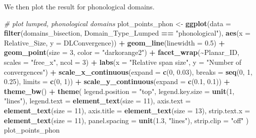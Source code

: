 \documentclass[
]{article}
\newenvironment{Shaded}{\begin{snugshade}}{\end{snugshade}}
\newcommand{\AttributeTok}[1]{\textcolor[rgb]{0.13,0.29,0.53}{#1}}
\newcommand{\CommentTok}[1]{\textcolor[rgb]{0.56,0.35,0.01}{\textit{#1}}}
\newcommand{\DecValTok}[1]{\textcolor[rgb]{0.00,0.00,0.81}{#1}}
\newcommand{\FloatTok}[1]{\textcolor[rgb]{0.00,0.00,0.81}{#1}}
\newcommand{\FunctionTok}[1]{\textcolor[rgb]{0.13,0.29,0.53}{\textbf{#1}}}
\newcommand{\NormalTok}[1]{#1}
\newcommand{\OtherTok}[1]{\textcolor[rgb]{0.56,0.35,0.01}{#1}}
\newcommand{\SpecialCharTok}[1]{\textcolor[rgb]{0.81,0.36,0.00}{\textbf{#1}}}
\newcommand{\StringTok}[1]{\textcolor[rgb]{0.31,0.60,0.02}{#1}}
\begin{document}
We then plot the result for phonological domains.

\begin{Shaded}
\begin{Highlighting}[]
\CommentTok{\# plot lumped, phonological domains}
\NormalTok{plot\_points\_phon }\OtherTok{\textless{}{-}} \FunctionTok{ggplot}\NormalTok{(}\AttributeTok{data =} \FunctionTok{filter}\NormalTok{(domains\_bisection, Domain\_Type\_Lumped }\SpecialCharTok{==} \StringTok{"phonological"}\NormalTok{), }\FunctionTok{aes}\NormalTok{(}\AttributeTok{x =}\NormalTok{ Relative\_Size, }\AttributeTok{y =}\NormalTok{ DLConvergence)) }\SpecialCharTok{+}
  \FunctionTok{geom\_line}\NormalTok{(}\AttributeTok{linewidth =} \FloatTok{0.5}\NormalTok{) }\SpecialCharTok{+}
  \FunctionTok{geom\_point}\NormalTok{(}\AttributeTok{size =} \DecValTok{3}\NormalTok{, }\AttributeTok{color =} \StringTok{"darkorange2"}\NormalTok{) }\SpecialCharTok{+}
  \FunctionTok{facet\_wrap}\NormalTok{(}\SpecialCharTok{\textasciitilde{}}\NormalTok{Planar\_ID, }\AttributeTok{scales =} \StringTok{"free\_x"}\NormalTok{, }\AttributeTok{ncol =} \DecValTok{3}\NormalTok{) }\SpecialCharTok{+}
  \FunctionTok{labs}\NormalTok{(}\AttributeTok{x =} \StringTok{"Relative span size"}\NormalTok{, }\AttributeTok{y =} \StringTok{"Number of convergences"}\NormalTok{) }\SpecialCharTok{+}
  \FunctionTok{scale\_x\_continuous}\NormalTok{(}\AttributeTok{expand =} \FunctionTok{c}\NormalTok{(}\DecValTok{0}\NormalTok{, }\FloatTok{0.03}\NormalTok{), }\AttributeTok{breaks =} \FunctionTok{seq}\NormalTok{(}\DecValTok{0}\NormalTok{, }\DecValTok{1}\NormalTok{, }\FloatTok{0.25}\NormalTok{), }\AttributeTok{limits =} \FunctionTok{c}\NormalTok{(}\DecValTok{0}\NormalTok{, }\DecValTok{1}\NormalTok{)) }\SpecialCharTok{+}
  \FunctionTok{scale\_y\_continuous}\NormalTok{(}\AttributeTok{expand =} \FunctionTok{c}\NormalTok{(}\FloatTok{0.1}\NormalTok{, }\FloatTok{0.1}\NormalTok{)) }\SpecialCharTok{+}
  \FunctionTok{theme\_bw}\NormalTok{() }\SpecialCharTok{+}
  \FunctionTok{theme}\NormalTok{(}
    \AttributeTok{legend.position =} \StringTok{"top"}\NormalTok{,}
    \AttributeTok{legend.key.size =} \FunctionTok{unit}\NormalTok{(}\DecValTok{1}\NormalTok{, }\StringTok{"lines"}\NormalTok{),}
    \AttributeTok{legend.text =} \FunctionTok{element\_text}\NormalTok{(}\AttributeTok{size =} \DecValTok{11}\NormalTok{),}
    \AttributeTok{axis.text =} \FunctionTok{element\_text}\NormalTok{(}\AttributeTok{size =} \DecValTok{11}\NormalTok{),}
    \AttributeTok{axis.title =} \FunctionTok{element\_text}\NormalTok{(}\AttributeTok{size =} \DecValTok{13}\NormalTok{),}
    \AttributeTok{strip.text.x =} \FunctionTok{element\_text}\NormalTok{(}\AttributeTok{size =} \DecValTok{11}\NormalTok{),}
    \AttributeTok{panel.spacing =} \FunctionTok{unit}\NormalTok{(}\FloatTok{1.3}\NormalTok{, }\StringTok{"lines"}\NormalTok{),}
    \AttributeTok{strip.clip =} \StringTok{"off"}
\NormalTok{  )}
\NormalTok{plot\_points\_phon}
\end{Highlighting}
\end{Shaded}
\end{document}
